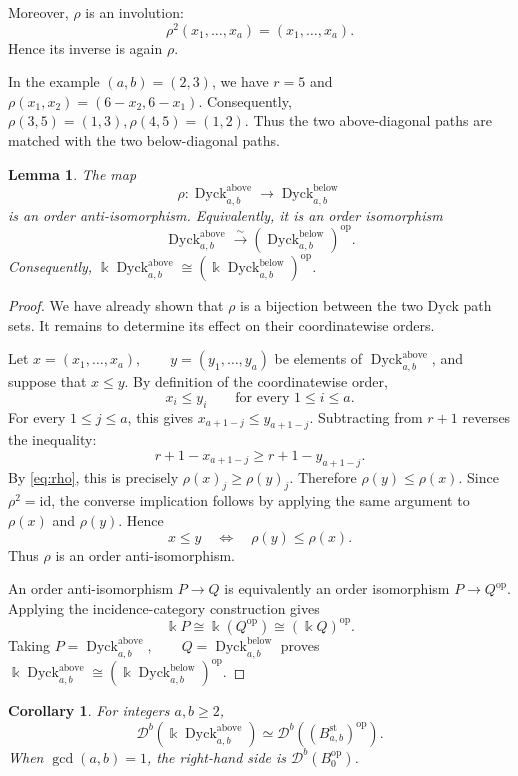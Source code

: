 \documentclass[12pt,a4paper,english,reqno]{amsart}
\theoremstyle{plain}
\newtheorem{lemma}[theorem]{Lemma}
\newtheorem{corollary}[theorem]{Corollary}
\theoremstyle{definition}
\newcommand{\kk}{\Bbbk}
\newcommand{\Dyck}{\operatorname{Dyck}}
\newcommand{\op}{\mathrm{op}}
\newcommand{\id}{\mathrm{id}}
\newcommand{\Db}[1]{{\mathscr D}^b(#1)}
\begin{document}
Moreover, $\rho$ is an involution:
\[
\rho^2(x_1,\ldots,x_a)=(x_1,\ldots,x_a).
\]
Hence its inverse is again $\rho$.

In the example $(a,b)=(2,3)$, we have $r=5$ and $\rho(x_1,x_2)=(6-x_2,6-x_1)$.
Consequently, $\rho(3,5)=(1,3),\rho(4,5)=(1,2)$.
Thus the two above-diagonal paths are matched with the two
below-diagonal paths.

\begin{lemma}
\label{lem:above-below}
The map
\[
\rho:
\Dyck^{\mathrm{above}}_{a,b}
\longrightarrow
\Dyck^{\mathrm{below}}_{a,b}
\]
is an order anti-isomorphism. Equivalently, it is an order isomorphism
\[
\Dyck^{\mathrm{above}}_{a,b}
\xrightarrow{\sim}
\left(\Dyck^{\mathrm{below}}_{a,b}\right)^{\op}.
\]
Consequently, $\kk\Dyck^{\mathrm{above}}_{a,b}
\cong(\kk\Dyck^{\mathrm{below}}_{a,b})^{\op}$.
\end{lemma}

\begin{proof}
We have already shown that $\rho$ is a bijection between the two Dyck
path sets. It remains to determine its effect on their coordinatewise
orders.

Let $x=(x_1,\ldots,x_a),\qquad y=(y_1,\ldots,y_a)$
be elements of $\Dyck^{\mathrm{above}}_{a,b}$, and suppose that $x\leq y.$
By definition of the coordinatewise order,
\[
x_i\leq y_i
\qquad
\text{for every }1\leq i\leq a.
\]
For every $1\leq j\leq a$, this gives $x_{a+1-j}\leq y_{a+1-j}.$
Subtracting from $r+1$ reverses the inequality:
\[
r+1-x_{a+1-j}
\geq
r+1-y_{a+1-j}.
\]
By \eqref{eq:rho}, this is precisely $\rho(x)_j\geq\rho(y)_j.$
Therefore $\rho(y)\leq\rho(x).$
Since $\rho^2=\id$, the converse implication follows by applying the
same argument to $\rho(x)$ and $\rho(y)$. Hence
\[
x\leq y
\quad\Longleftrightarrow\quad
\rho(y)\leq\rho(x).
\]
Thus $\rho$ is an order anti-isomorphism.

An order anti-isomorphism $P\to Q$ is equivalently an order isomorphism
$P\to Q^{\op}$. Applying the incidence-category construction gives
\[
\kk P
\cong
\kk(Q^{\op})
\cong
(\kk Q)^{\op}.
\]
Taking $P=\Dyck^{\mathrm{above}}_{a,b},
\qquad
Q=\Dyck^{\mathrm{below}}_{a,b}$
proves $\kk\Dyck^{\mathrm{above}}_{a,b}
\cong (\kk\Dyck^{\mathrm{below}}_{a,b})^{\op}.$
\end{proof}




\begin{corollary}
\label{cor:above-B0}
For integers $a,b\geq2$,
\[
 \Db{\kk\Dyck^{\mathrm{above}}_{a,b}}
 \simeq\Db{(B^{\mathrm{st}}_{a,b})^{\op}}.
\]
When $\gcd(a,b)=1$, the right-hand side is $\Db{B_0^{\op}}$.
\end{corollary}
\end{document}
